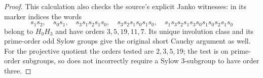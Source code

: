 \begin{proof}
This calculation also checks the source's explicit Janko witnesses: in its marker indices the words
\[
 s_1s_2,\quad s_0s_1,\quad s_3s_1s_2s_1s_0,\quad
 s_3s_2s_1s_0s_1s_0,\quad
 s_1s_3s_2s_1s_3s_0s_1s_0s_2s_1s_0
\]
belong to $H_0H_3$ and have orders $3,5,19,11,7$. Its unique involution class and its prime-order odd Sylow groups give the original short Cauchy argument as well. For the projective quotient the orders tested are $2,3,5,19$; the test is on prime-order subgroups, so does not incorrectly require a Sylow $3$-subgroup to have order three.
\end{proof}

